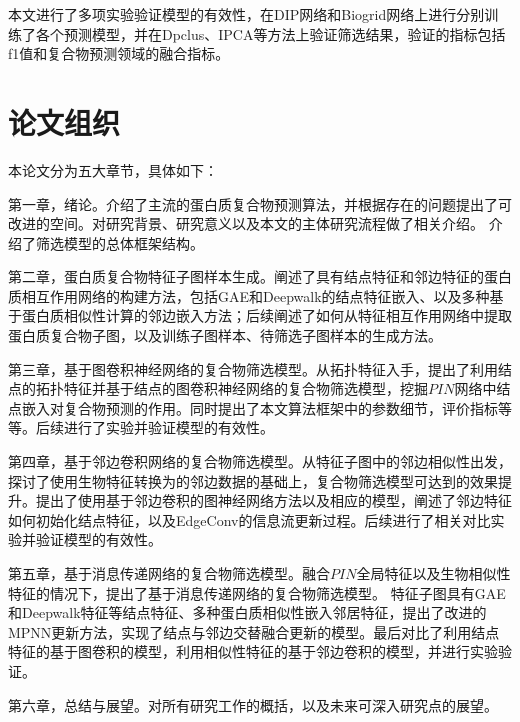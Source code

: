本文进行了多项实验验证模型的有效性，在DIP网络和Biogrid网络上进行分别训练了各个预测模型，并在Dpclus、IPCA等方法上验证筛选结果，验证的指标包括f1值和复合物预测领域的融合指标。

\section{论文组织}
\label{section:intro:organization}

本论文分为五大章节，具体如下：

第一章，绪论。介绍了主流的蛋白质复合物预测算法，并根据存在的问题提出了可改进的空间。对研究背景、研究意义以及本文的主体研究流程做了相关介绍。
介绍了筛选模型的总体框架结构。

第二章，蛋白质复合物特征子图样本生成。阐述了具有结点特征和邻边特征的蛋白质相互作用网络的构建方法，包括GAE和Deepwalk的结点特征嵌入、以及多种基于蛋白质相似性计算的邻边嵌入方法；后续阐述了如何从特征相互作用网络中提取蛋白质复合物子图，以及训练子图样本、待筛选子图样本的生成方法。

第三章，基于图卷积神经网络的复合物筛选模型。从拓扑特征入手，提出了利用结点的拓扑特征并基于结点的图卷积神经网络的复合物筛选模型，挖掘$PIN$网络中结点嵌入对复合物预测的作用。同时提出了本文算法框架中的参数细节，评价指标等等。后续进行了实验并验证模型的有效性。

第四章，基于邻边卷积网络的复合物筛选模型。从特征子图中的邻边相似性出发，探讨了使用生物特征转换为的邻边数据的基础上，复合物筛选模型可达到的效果提升。提出了使用基于邻边卷积的图神经网络方法以及相应的模型，阐述了邻边特征如何初始化结点特征，以及EdgeConv的信息流更新过程。后续进行了相关对比实验并验证模型的有效性。

第五章，基于消息传递网络的复合物筛选模型。融合$PIN$全局特征以及生物相似性特征的情况下，提出了基于消息传递网络的复合物筛选模型。
特征子图具有GAE和Deepwalk特征等结点特征、多种蛋白质相似性嵌入邻居特征，提出了改进的MPNN更新方法，实现了结点与邻边交替融合更新的模型。最后对比了利用结点特征的基于图卷积的模型，利用相似性特征的基于邻边卷积的模型，并进行实验验证。

第六章，总结与展望。对所有研究工作的概括，以及未来可深入研究点的展望。